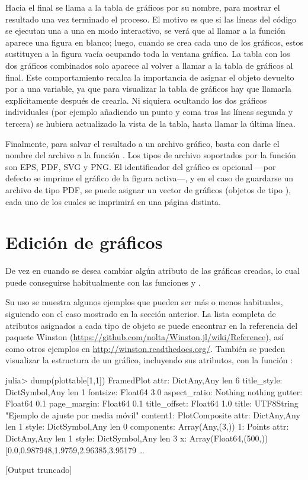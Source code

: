 Hacia el final se llama a la tabla de gráficos por su nombre, para mostrar el resultado una vez terminado el proceso. El motivo es que si las líneas del código se ejecutan una a una en modo interactivo, se verá que al llamar a la función  aparece una figura en blanco; luego, cuando se crea cada uno de los gráficos, estos sustituyen a la figura vacía ocupando toda la ventana gráfica. La tabla con los dos gráficos combinados solo aparece al volver a llamar a la tabla de gráficos al final. Este comportamiento recalca la importancia de asignar el objeto devuelto por  a una variable, ya que para visualizar la tabla de gráficos hay que llamarla explícitamente después de crearla. Ni siquiera ocultando los dos gráficos individuales (por ejemplo añadiendo un punto y coma tras las líneas segunda y tercera) se hubiera actualizado la vista de la tabla, hasta llamar la última línea.

Finalmente, para salvar el resultado a un archivo gráfico, basta con darle el nombre del archivo a la función . Los tipos de archivo soportados por la función son EPS, PDF, SVG y PNG. El identificador del gráfico es opcional ---por defecto se imprime el gráfico de la figura activa---, y en el caso de guardarse un archivo de tipo PDF, se puede asignar un vector de gráficos (objetos de tipo ), cada uno de los cuales se imprimirá en una página distinta.


\section{Edición de gráficos}

De vez en cuando se desea cambiar algún atributo de las gráficas creadas, lo cual puede conseguirse habitualmente con las funciones  y .

Su uso se muestra algunos ejemplos que pueden ser más o menos habituales, siguiendo con el caso mostrado en la sección anterior. La lista completa de atributos asignados a cada tipo de objeto se puede encontrar en la referencia del paquete Winston (\url{https://github.com/nolta/Winston.jl/wiki/Reference}), así como otros ejemplos en \url{http://winston.readthedocs.org/}. También se pueden visualizar la estructura de un gráfico, incluyendo sus atributos, con la función :

\begin{jlconcode}
julia> dump(plottable[1,1])
FramedPlot 
  attr: Dict{Any,Any} len 6
    title_style: Dict{Symbol,Any} len 1
      fontsize: Float64 3.0
    aspect_ratio: Nothing nothing
    gutter: Float64 0.1
    page_margin: Float64 0.1
    title_offset: Float64 1.0
    title: UTF8String "Ejemplo de ajuste por media móvil"
  content1: PlotComposite 
    attr: Dict{Any,Any} len 1
      style: Dict{Symbol,Any} len 0
    components: Array(Any,(3,))
      1: Points 
        attr: Dict{Any,Any} len 1
          style: Dict{Symbol,Any} len 3
        x: Array(Float64,(500,)) [0.0,0.987948,1.9759,2.96385,3.95179 …  

[Output truncado]
\end{jlconcode}

